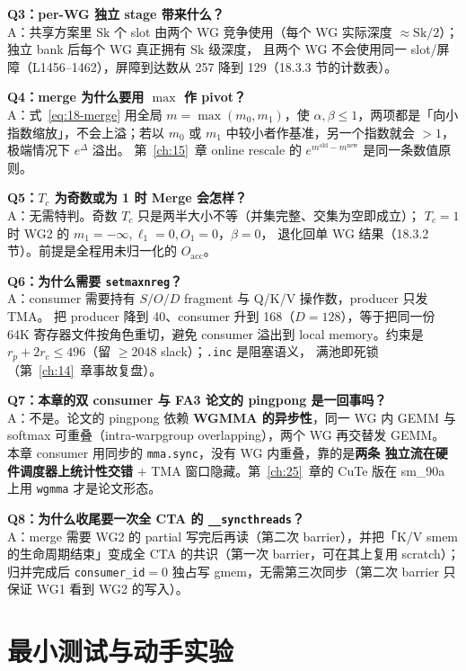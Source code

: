 \textbf{Q3：per-WG 独立 stage 带来什么？}\\
A：共享方案里 $\mathrm{Sk}$ 个 slot 由两个 WG 竞争使用（每个 WG 实际深度
$\approx \mathrm{Sk}/2$）；独立 bank 后每个 WG 真正拥有 $\mathrm{Sk}$ 级深度，
且两个 WG 不会使用同一 slot/屏障（L1456--1462），屏障到达数从 257 降到
129（18.3.3 节的计数表）。

\textbf{Q4：merge 为什么要用 $\max$ 作 pivot？}\\
A：式~\ref{eq:18-merge} 用全局 $m = \max(m_0, m_1)$，使
$\alpha, \beta \le 1$，两项都是「向小指数缩放」，不会上溢；若以 $m_0$ 或
$m_1$ 中较小者作基准，另一个指数就会 $> 1$，极端情况下 $e^{\Delta}$ 溢出。
第~\ref{ch:15}~章 online rescale 的 $e^{m^{\mathrm{old}}-m^{\mathrm{new}}}$
是同一条数值原则。

\textbf{Q5：$T_c$ 为奇数或为 1 时 Merge 会怎样？}\\
A：无需特判。奇数 $T_c$ 只是两半大小不等（并集完整、交集为空即成立）；
$T_c{=}1$ 时 WG2 的 $m_1 = -\infty, \ell_1 = 0, O_1 = 0$，$\beta = 0$，
退化回单 WG 结果（18.3.2 节）。前提是全程用未归一化的 $O_{\mathrm{acc}}$。

\textbf{Q6：为什么需要 \texttt{setmaxnreg}？}\\
A：consumer 需要持有 $S/O/D$ fragment 与 Q/K/V 操作数，producer 只发 TMA。
把 producer 降到 40、consumer 升到 168（$D{=}128$），等于把同一份 64K
寄存器文件按角色重切，避免 consumer 溢出到 local memory。约束是
$r_p + 2r_c \le 496$（留 $\ge 2048$ slack）；\texttt{.inc} 是阻塞语义，
满池即死锁（第~\ref{ch:14}~章事故复盘）。

\textbf{Q7：本章的双 consumer 与 FA3 论文的 pingpong 是一回事吗？}\\
A：不是。论文的 pingpong 依赖 \textbf{WGMMA 的异步性}，同一 WG 内 GEMM 与
softmax 可重叠（intra-warpgroup overlapping），两个 WG 再交替发 GEMM。
本章 consumer 用同步的 \texttt{mma.sync}，没有 WG 内重叠，靠的是\textbf{两条
独立流在硬件调度器上统计性交错} $+$ TMA 窗口隐藏。第~\ref{ch:25}~章的 CuTe
版在 sm\_90a 上用 \texttt{wgmma} 才是论文形态。

\textbf{Q8：为什么收尾要一次全 CTA 的 \texttt{\_\allowbreak{}\_\allowbreak{}syncthreads}？}\\
A：merge 需要 WG2 的 partial 写完后再读（第二次 barrier），并把「K/V smem
的生命周期结束」变成全 CTA 的共识（第一次 barrier，可在其上复用 scratch）；
归并完成后
\texttt{consumer\_id}$=0$ 独占写 gmem，无需第三次同步（第二次 barrier 只保证
WG1 看到 WG2 的写入）。

\section{最小测试与动手实验}

